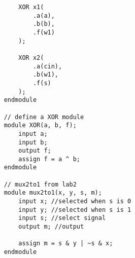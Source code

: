 \documentclass[oneside, 10pt]{book}
\begin{document}
\begin{verbatim}
        XOR x1(
            .a(a),
            .b(b),
            .f(w1)
        );
        
        XOR x2(
            .a(cin),
            .b(w1),
            .f(s)
        );
    endmodule

    // define a XOR module
    module XOR(a, b, f);
        input a;
        input b;
        output f;
        assign f = a ^ b;
    endmodule

    // mux2to1 from lab2
    module mux2to1(x, y, s, m);
        input x; //selected when s is 0
        input y; //selected when s is 1
        input s; //select signal
        output m; //output
        
        assign m = s & y | ~s & x;
    endmodule

\end{verbatim}
\end{document}
